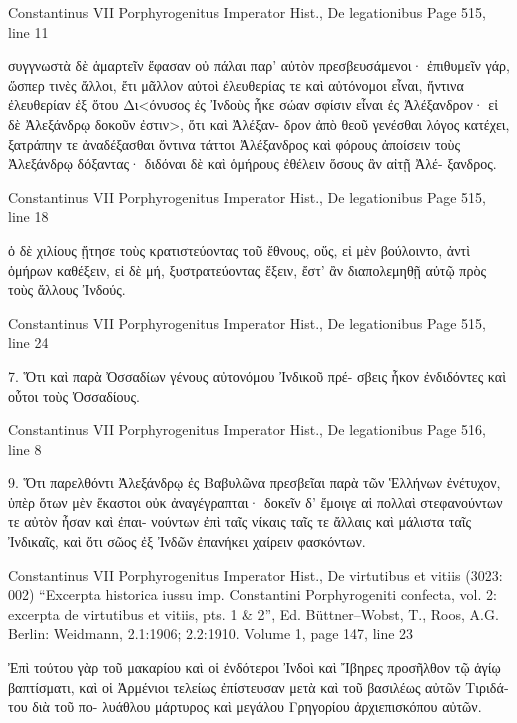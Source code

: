 \documentclass[12pt,letterpaper,twoside,final]{memoir}
\begin{document}
\begin{greek}
Constantinus VII Porphyrogenitus Imperator Hist., De legationibus 
Page 515, line 11

                                   συγγνωστὰ δὲ ἁμαρτεῖν ἔφασαν οὐ 
πάλαι παρ' αὐτὸν πρεσβευσάμενοι· ἐπιθυμεῖν γάρ, ὥσπερ τινὲς 
ἄλλοι, ἔτι μᾶλλον αὐτοὶ ἐλευθερίας τε καὶ αὐτόνομοι εἶναι, ἥντινα 
ἐλευθερίαν ἐξ ὅτου Δι<όνυσος ἐς Ἰνδοὺς ἧκε σώαν σφίσιν εἶναι 
ἐς Ἀλέξανδρον· εἰ δὲ Ἀλεξάνδρῳ δοκοῦν ἐστιν>, ὅτι καὶ Ἀλέξαν-
δρον ἀπὸ θεοῦ γενέσθαι λόγος κατέχει, ξατράπην τε ἀναδέξασθαι 
ὅντινα τάττοι Ἀλέξανδρος καὶ φόρους ἀποίσειν τοὺς Ἀλεξάνδρῳ 
δόξαντας· διδόναι δὲ καὶ ὁμήρους ἐθέλειν ὅσους ἂν αἰτῇ Ἀλέ-
ξανδρος. 



Constantinus VII Porphyrogenitus Imperator Hist., De legationibus 
Page 515, line 18

         ὁ δὲ χιλίους ᾔτησε τοὺς κρατιστεύοντας τοῦ ἔθνους, οὕς, 
εἰ μὲν βούλοιντο, ἀντὶ ὁμήρων καθέξειν, εἰ δὲ μή, ξυστρατεύοντας 
ἕξειν, ἔστ' ἂν διαπολεμηθῇ αὐτῷ πρὸς τοὺς ἄλλους Ἰνδούς. 



Constantinus VII Porphyrogenitus Imperator Hist., De legationibus 
Page 515, line 24

7. Ὅτι καὶ παρὰ Ὀσσαδίων γένους αὐτονόμου Ἰνδικοῦ πρέ-
σβεις ἧκον ἐνδιδόντες καὶ οὗτοι τοὺς Ὀσσαδίους. 



Constantinus VII Porphyrogenitus Imperator Hist., De legationibus 
Page 516, line 8

9. Ὅτι παρελθόντι Ἀλεξάνδρῳ ἐς Βαβυλῶνα πρεσβεῖαι παρὰ 
τῶν Ἑλλήνων ἐνέτυχον, ὑπὲρ ὅτων μὲν ἕκαστοι οὐκ ἀναγέγραπται· 
δοκεῖν δ' ἔμοιγε αἱ πολλαὶ στεφανούντων τε αὐτὸν ἦσαν καὶ ἐπαι-
νούντων ἐπὶ ταῖς νίκαις ταῖς τε ἄλλαις καὶ μάλιστα ταῖς Ἰνδικαῖς, 
καὶ ὅτι σῶος ἐξ Ἰνδῶν ἐπανήκει χαίρειν φασκόντων. 



Constantinus VII Porphyrogenitus Imperator Hist., De virtutibus et vitiis (3023: 002)
“Excerpta historica iussu imp. Constantini Porphyrogeniti confecta, vol. 2: excerpta de virtutibus et vitiis, pts. 1 \& 2”, Ed. Büttner–Wobst, T., Roos, A.G.
Berlin: Weidmann, 2.1:1906; 2.2:1910.
Volume 1, page 147, line 23

Ἐπὶ τούτου γὰρ τοῦ μακαρίου καὶ οἱ ἐνδότεροι Ἰνδοὶ καὶ 
Ἴβηρες προσῆλθον τῷ ἁγίῳ βαπτίσματι, καὶ οἱ Ἀρμένιοι τελείως 
ἐπίστευσαν μετὰ καὶ τοῦ βασιλέως αὐτῶν Τιριδάτου διὰ τοῦ πο-
λυάθλου μάρτυρος καὶ μεγάλου Γρηγορίου ἀρχιεπισκόπου αὐτῶν. 




\end{greek}
\end{document}

